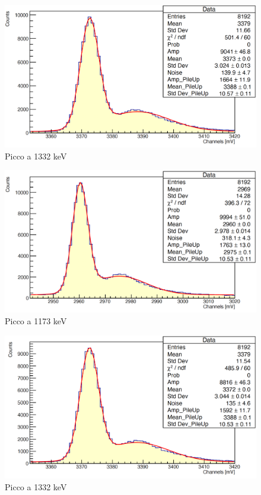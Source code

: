 \documentclass[a4paper,10pt]{article}
\begin{document}
\begin{figure}[H]
    \centering
    \includegraphics[scale=0.45]{appendice/spettri/CoCu2_22}
    \caption{Picco a 1332 keV}
\end{figure}
\begin{figure}[H]
    \centering
    \includegraphics[scale=0.45]{appendice/spettri/CoCu1_33}
    \caption{Picco a 1173 keV}
\end{figure}
\begin{figure}[H]
    \centering
    \includegraphics[scale=0.45]{appendice/spettri/CoCu2_33}
    \caption{Picco a 1332 keV}
\end{figure}
\end{document}
